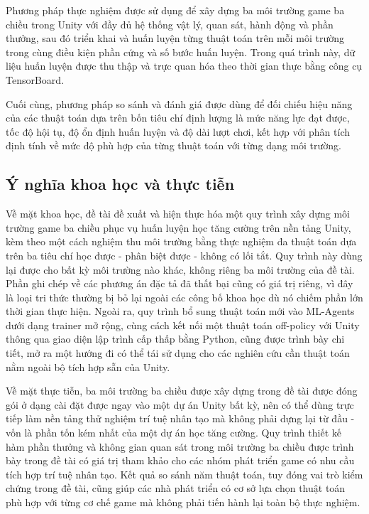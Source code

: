 \indent Phương pháp thực nghiệm được sử dụng để xây dựng ba môi trường game ba chiều
trong Unity với đầy đủ hệ thống vật lý, quan sát, hành động và phần thưởng, sau đó
triển khai và huấn luyện từng thuật toán trên mỗi môi trường trong cùng điều kiện phần
cứng và số bước huấn luyện. Trong quá trình này, dữ liệu huấn luyện được thu thập và
trực quan hóa theo thời gian thực bằng công cụ TensorBoard.

\indent Cuối cùng, phương pháp so sánh và đánh giá được dùng để đối chiếu hiệu năng
của các thuật toán dựa trên bốn tiêu chí định lượng là mức năng lực đạt được, tốc độ
hội tụ, độ ổn định huấn luyện và độ dài lượt chơi, kết hợp với phân tích
định tính về mức độ phù hợp của từng thuật toán với từng dạng môi trường.

\subsection{Ý nghĩa khoa học và thực tiễn}

\indent Về mặt khoa học, đề tài đề xuất và hiện thực hóa một quy trình xây dựng môi
trường game ba chiều phục vụ huấn luyện học tăng cường trên nền tảng Unity, kèm theo
một cách nghiệm thu môi trường bằng thực nghiệm đa thuật toán dựa trên ba tiêu chí học
được - phân biệt được - không có lối tắt. Quy trình này dùng lại được cho bất kỳ môi
trường nào khác, không riêng ba môi trường của đề tài. Phần ghi chép về các phương án
đặc tả đã thất bại cũng có giá trị riêng, vì đây là loại tri thức thường bị bỏ lại
ngoài các công bố khoa học dù nó chiếm phần lớn thời gian thực hiện. Ngoài ra, quy
trình bổ sung thuật toán mới vào ML-Agents dưới dạng trainer mở rộng, cùng cách kết nối
một thuật toán off-policy với Unity thông qua giao diện lập trình cấp thấp bằng Python,
cũng được trình bày chi tiết, mở ra một hướng đi có thể tái sử dụng cho các nghiên cứu
cần thuật toán nằm ngoài bộ tích hợp sẵn của Unity.

\indent Về mặt thực tiễn, ba môi trường ba chiều được xây dựng trong đề tài được đóng
gói ở dạng cài đặt được ngay vào một dự án Unity bất kỳ, nên có thể dùng trực tiếp làm
nền tảng thử nghiệm trí tuệ nhân tạo mà không phải dựng lại từ đầu - vốn là phần tốn
kém nhất của một dự án học tăng cường. Quy trình thiết kế hàm phần thưởng và không gian
quan sát trong môi trường ba chiều được trình bày trong đề tài có giá trị tham khảo cho
các nhóm phát triển game có nhu cầu tích hợp trí tuệ nhân tạo. Kết quả so sánh năm thuật
toán, tuy đóng vai trò kiểm chứng trong đề tài, cũng giúp các nhà phát triển có cơ sở
lựa chọn thuật toán phù hợp với từng cơ chế game mà không phải tiến hành lại toàn bộ
thực nghiệm.

